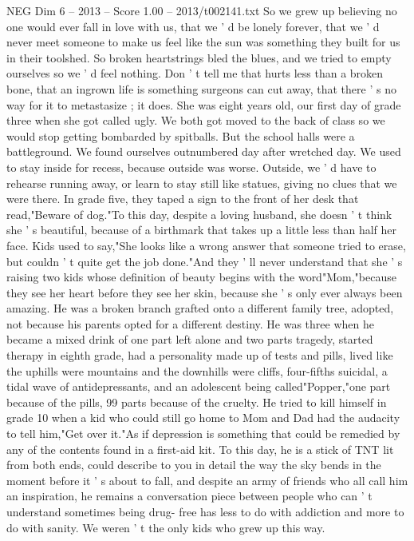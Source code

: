 \begin{textsample}{NEG Dim 6 – 2013 – Score 1.00 – 2013/t002141.txt}
So we grew up believing no one would ever fall in love with us, that we ' d be lonely forever, that we ' d never meet someone to make us feel like the sun was something they built for us in their toolshed.
So broken heartstrings bled the blues, and we tried to empty ourselves so we ' d feel nothing.
Don ' t tell me that hurts less than a broken bone, that an ingrown life is something surgeons can cut away, that there ' s no way for it to metastasize ; it does.
She was eight years old, our first day of grade three when she got called ugly.
We both got moved to the back of class so we would stop getting bombarded by spitballs.
But the school halls were a battleground.
We found ourselves outnumbered day after wretched day.
We used to stay inside for recess, because outside was worse.
Outside, we ' d have to rehearse running away, or learn to stay still like statues, giving no clues that we were there.
In grade five, they taped a sign to the front of her desk that read,"Beware of dog."To this day, despite a loving husband, she doesn ' t think she ' s beautiful, because of a birthmark that takes up a little less than half her face.
Kids used to say,"She looks like a wrong answer that someone tried to erase, but couldn ' t quite get the job done."And they ' ll never understand that she ' s raising two kids whose definition of beauty begins with the word"Mom,"because they see her heart before they see her skin, because she ' s only ever always been amazing.
He was a broken branch grafted onto a different family tree, adopted, not because his parents opted for a different destiny.
He was three when he became a mixed drink of one part left alone and two parts tragedy, started therapy in eighth grade, had a personality made up of tests and pills, lived like the uphills were mountains and the downhills were cliffs, four-fifths suicidal, a tidal wave of antidepressants, and an adolescent being called"Popper,"one part because of the pills, 99 parts because of the cruelty.
He tried to kill himself in grade 10 when a kid who could still go home to Mom and Dad had the audacity to tell him,"Get over it."As if depression is something that could be remedied by any of the contents found in a first-aid kit.
To this day, he is a stick of TNT lit from both ends, could describe to you in detail the way the sky bends in the moment before it ' s about to fall, and despite an army of friends who all call him an inspiration, he remains a conversation piece between people who can ' t understand sometimes being drug- free has less to do with addiction and more to do with sanity.
We weren ' t the only kids who grew up this way.

\end{textsample}
